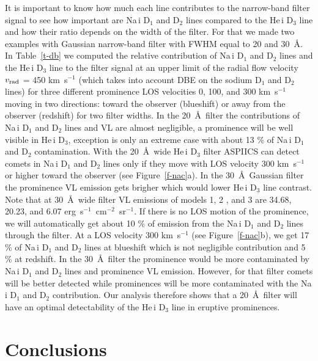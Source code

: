 \documentclass[namedreferences]{solarphysics}
\begin{document}
\begin{article}
It is important to know how much each line contributes to the narrow-band filter signal to see how important are 
Na\,{\sc i} D$_{1}$ and D$_{2}$ lines 
compared to the He\,{\sc i} D$_{3}$ line and how their ratio depends on the width of the filter. For that we made two examples with Gaussian narrow-band filter with FWHM equal to 20 and 30~\AA. 
In Table~\ref{t-db} we computed the relative contribution of Na\,{\sc i} D$_{1}$ and D$_{2}$ lines and the He\,{\sc i} D$_{3}$ line to the filter signal at an 
upper limit of the radial flow velocity $v_{\rm rad}$ = 450 km~s$^{-1}$ (which takes into account DBE on 
the sodium D$_{1}$ and D$_{2}$ lines) for three 
different prominence LOS velocities 0, 100, and 300 km~s$^{-1}$ moving in two directions: toward the observer (blueshift) or away from the observer 
(redshift) for two filter widths. 
In the 20~\AA~filter the contributions of Na\,{\sc i} D$_{1}$ and D$_{2}$ lines and VL are almost negligible, a prominence will be well visible in 
He\,{\sc i} D$_{3}$, exception is only an extreme case with about 13 \% of Na\,{\sc i} D$_{1}$ and D$_{2}$ contamination. 
With the 20~\AA~wide He\,{\sc i} D$_{3}$ filter ASPIICS can detect comets in Na\,{\sc i} D$_{1}$ and D$_{2}$ lines only 
if they move with LOS velocity 300 km~s$^{-1}$ or higher toward the observer (see Figure~\ref{f-nac}a). 
In the 30~\AA~Gaussian filter the prominence VL emission gets brigher which would lower He\,{\sc i} D$_{3}$ line contrast. 
Note that at 30~\AA~wide filter VL emissions of models 1, 2 , and 3 are 34.68, 20.23, and 6.07 
erg~s$^{-1}$~cm$^{-2}$~sr$^{-1}$. If there is no LOS motion of the prominence, we will automatically 
get about 10 \% of emission from the Na\,{\sc i} D$_{1}$ and D$_{2}$ lines through the filter. At a LOS velocity 300 km~s$^{-1}$ (see Figure~\ref{f-nac}b), 
we get 17 \% of Na\,{\sc i} D$_{1}$ and D$_{2}$ lines 
at blueshift which is not negligible contribution and 5 \% at redshift.  In the 30~\AA~filter the prominence would be more
contaminated by Na\,{\sc i} D$_{1}$ and D$_{2}$ lines and prominence VL emission. However, for that filter comets will be better detected while prominences 
will be more contaminated with the Na\,{\sc i} D$_{1}$ and D$_{2}$ contribution. Our analysis therefore shows that a 20~\AA~filter will have an optimal 
detectability of the He\,{\sc i} D$_{3}$ line in eruptive prominences.



\section{Conclusions}
	\label{s-con}


\end{article}
\end{document}
